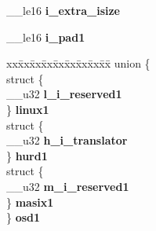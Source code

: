 \begin{DoxyCompactItemize}
\begin{tabbing}
\end{tabbing}\item 
\mbox{\label{structext2__inode_a4d80b2b7d87baae307a63ff7cd502e98}} 
\+\_\+\+\_\+le16 {\bfseries i\+\_\+extra\+\_\+isize}
\item 
\mbox{\label{structext2__inode_aae94368c036b523cbdc14d7afffcba0f}} 
\+\_\+\+\_\+le16 {\bfseries i\+\_\+pad1}
\item 
\mbox{\label{structext2__inode_a67646ebc7267cc3642a220cff1fca37f}} 
\begin{tabbing}
xx\=xx\=xx\=xx\=xx\=xx\=xx\=xx\=xx\=\kill
union \{\\
\>struct \{\\
\>\>\_\_u32 {\bfseries l\_i\_reserved1}\\
\>\} {\bfseries linux1}\\
\>struct \{\\
\>\>\_\_u32 {\bfseries h\_i\_translator}\\
\>\} {\bfseries hurd1}\\
\>struct \{\\
\>\>\_\_u32 {\bfseries m\_i\_reserved1}\\
\>\} {\bfseries masix1}\\
\} {\bfseries osd1}\\


\end{tabbing}
\end{DoxyCompactItemize}
